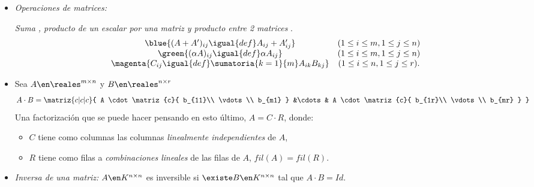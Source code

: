 \begin{enumerate}[label=\tiny\purple{\faIcon{snowman}}]
\begin{itemize}
          \item \hypertarget{teoria-1:operaciones-matrices}{\textit{Operaciones de matrices:}}

                \textit{Suma , producto de un escalar por una matriz  y producto entre 2 matrices} .
                $$
                  \begin{array}{ccc}
                    \blue{(A + A')_{ij} \igual{def} A_{ij} + A'_{ij}}              & (1 \leq i \leq m, 1 \leq j \leq n)  \\
                    \green{(\alpha A)_{ij} \igual{def} \alpha A_{ij}}              & (1 \leq i \leq m, 1 \leq j \leq n)  \\
                    \magenta{C_{ij} \igual{def} \sumatoria{k = 1}{m} A_{ik}B_{kj}} & (1 \leq i \leq n, 1 \leq j \leq r).
                  \end{array}
                $$

          \item Sea $A \en \reales^{m \times n}$ y $B \en \reales^{n \times r}$
                $$
                  A\cdot B  =
                  \matriz{c|c|c}{
                    A \cdot
                    \matriz{c}{
                      b_{11}\\
                      \vdots\\
                      b_{m1}
                    }
                    &\cdots&
                    A \cdot
                    \matriz{c}{
                      b_{1r}\\
                      \vdots\\
                      b_{mr}
                    }
                  }
                $$
                Una factorización que se puede hacer pensando en esto último, $ A = C \cdot R$, donde:
                \begin{itemize}
                  \item $C$ tiene como columnas las columnas \textit{linealmente independientes} de $A$,
                  \item $R$ tiene como filas a \textit{combinaciones lineales} de las filas de $A$, $fil(A) = fil(R)$.
                \end{itemize}

          \item \textit{Inversa de una matriz:}
                $A \en K^{n \times n}$ es inversible si $\existe B \en K^{n \times n}$ tal que $A \cdot B = Id$.
        \end{itemize}
\end{enumerate}

